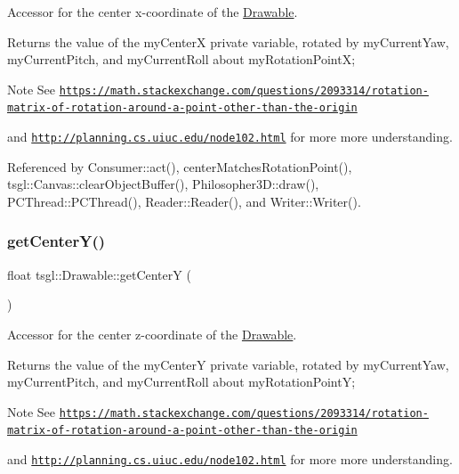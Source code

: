 Accessor for the center x-\/coordinate of the \hyperlink{classtsgl_1_1_drawable}{Drawable}. 

Returns the value of the my\+CenterX private variable, rotated by my\+Current\+Yaw, my\+Current\+Pitch, and my\+Current\+Roll about my\+Rotation\+PointX; \begin{DoxyNote}{Note}
See \href{https://math.stackexchange.com/questions/2093314/rotation-matrix-of-rotation-around-a-point-other-than-the-origin}{\tt https\+://math.\+stackexchange.\+com/questions/2093314/rotation-\/matrix-\/of-\/rotation-\/around-\/a-\/point-\/other-\/than-\/the-\/origin} 

and \href{http://planning.cs.uiuc.edu/node102.html}{\tt http\+://planning.\+cs.\+uiuc.\+edu/node102.\+html} for more more understanding. 
\end{DoxyNote}


Referenced by Consumer\+::act(), center\+Matches\+Rotation\+Point(), tsgl\+::\+Canvas\+::clear\+Object\+Buffer(), Philosopher3\+D\+::draw(), P\+C\+Thread\+::\+P\+C\+Thread(), Reader\+::\+Reader(), and Writer\+::\+Writer().

\mbox{\label{classtsgl_1_1_drawable_ad78d781f078bab0f458892757f100e7f}} 
\subsubsection{\texorpdfstring{get\+Center\+Y()}{getCenterY()}}
{\footnotesize\ttfamily float tsgl\+::\+Drawable\+::get\+CenterY (\begin{DoxyParamCaption}{ }\end{DoxyParamCaption})\hspace{0.3cm}{\ttfamily [virtual]}}



Accessor for the center z-\/coordinate of the \hyperlink{classtsgl_1_1_drawable}{Drawable}. 

Returns the value of the my\+CenterY private variable, rotated by my\+Current\+Yaw, my\+Current\+Pitch, and my\+Current\+Roll about my\+Rotation\+PointY; \begin{DoxyNote}{Note}
See \href{https://math.stackexchange.com/questions/2093314/rotation-matrix-of-rotation-around-a-point-other-than-the-origin}{\tt https\+://math.\+stackexchange.\+com/questions/2093314/rotation-\/matrix-\/of-\/rotation-\/around-\/a-\/point-\/other-\/than-\/the-\/origin} 

and \href{http://planning.cs.uiuc.edu/node102.html}{\tt http\+://planning.\+cs.\+uiuc.\+edu/node102.\+html} for more more understanding. 
\end{DoxyNote}


